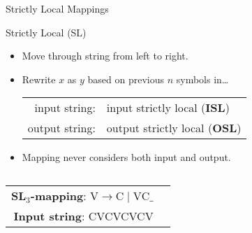 \documentclass[xcolor={usenames,svgnames,x11names,table}]{beamer}
\begin{document}
\begin{frame}{Strictly Local Mappings}
    \begin{block}{Strictly Local (SL)}
        \begin{itemize}
            \item Move through string from left to right.
            \item Rewrite $x$ as $y$ based on previous $n$ symbols in\ldots
                \begin{center}
                    \begin{tabular}{rl}
                        input string: & input strictly local (\textbf{ISL})\\
                        output string: & output strictly local (\textbf{OSL})\\
                    \end{tabular}
                \end{center}
            \item Mapping never considers both input and output.\\
        \end{itemize}
    \end{block}
    \begin{example}
        \begin{columns}
            \begin{center}
                \begin{tabular}{rl}
                    \textbf{SL$_3$-mapping}: $\text{V} \rightarrow \text{C} \mid \text{VC} \_$\\
                    \textbf{Input string}: CVCVCVCV
                \end{tabular}
            \end{center}
            

\end{columns}
\end{example}
\end{frame}
\end{document}
